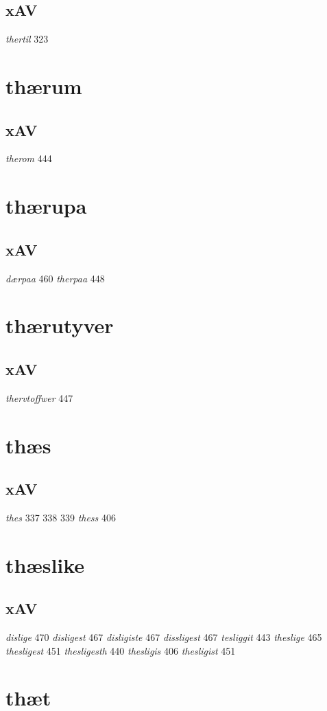 \documentclass[a4paper,twocolumn]{article}
\begin{document}
\subsection{xAV}
\label{sec:orgfcc9056}
\emph{thertil} 323 
\section{thærum}
\label{sec:org590250c}
\subsection{xAV}
\label{sec:org77ced5e}
\emph{therom} 444 
\section{thærupa}
\label{sec:org597a6bc}
\subsection{xAV}
\label{sec:org338b6be}
\emph{dærpaa} 460 \emph{therpaa} 448 
\section{thærutyver}
\label{sec:org3ddbb7d}
\subsection{xAV}
\label{sec:org6d24206}
\emph{thervtoffwer} 447 
\section{thæs}
\label{sec:org172db4d}
\subsection{xAV}
\label{sec:org5816354}
\emph{thes} 337 338 339 \emph{thess} 406 
\section{thæslike}
\label{sec:org05cd4e2}
\subsection{xAV}
\label{sec:org66bf9b8}
\emph{dislige} 470 \emph{disligest} 467 \emph{disligiste} 467 \emph{dissligest} 467 \emph{tesliggit} 443 \emph{theslige} 465 \emph{thesligest} 451 \emph{thesligesth} 440 \emph{thesligis} 406 \emph{thesligist} 451 
\section{thæt}
\label{sec:org4725abd}
\end{document}
